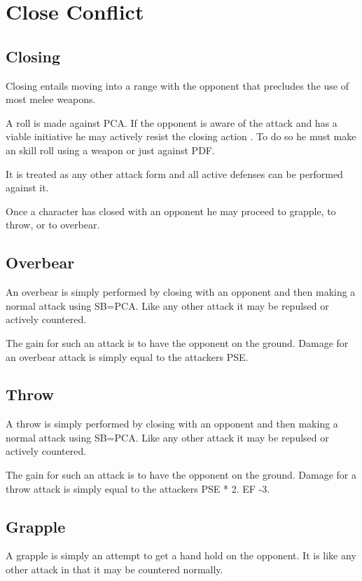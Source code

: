 \section{Close Conflict}

\subsection{Closing}

Closing entails moving into a range with the opponent that 
precludes the use of most melee weapons.

A roll is made against PCA. If the opponent is aware of the attack 
and has a viable initiative he may actively resist the closing action 
. To do so he must make an skill roll using a weapon or just against 
PDF.

It is treated as any other attack form and all active defenses can be 
performed against it.

Once a character has closed with an opponent he may proceed to 
grapple, to throw, or to overbear.

\subsection{Overbear}

An overbear is simply performed by closing with an opponent and then 
making a normal attack using SB=PCA. Like any other attack it may be 
repulsed or actively countered.

The gain for such an attack is to have the opponent on the ground.
Damage for an overbear attack is simply equal to the attackers PSE.

\subsection{Throw}

A throw is simply performed by closing with an opponent and then 
making a normal attack using SB=PCA. Like any other attack it may be 
repulsed or actively countered.

The gain for such an attack is to have the opponent on the ground.
Damage for a throw attack is simply equal to the attackers PSE * 2. 
EF -3.

\subsection{Grapple}

A grapple is simply an attempt to get a hand hold on the opponent. 
It is like any other attack in that it may be countered normally.


